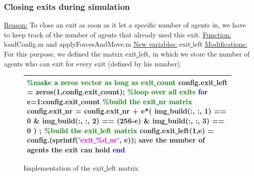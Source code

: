 \documentclass[11pt]{article}
\begin{document}
\subsubsection{Closing exits during simulation}

\underline{Reason:}
\newline
To close an exit as soon as it let a specific number of agents in, we have to keep track of the number of agents that already used this exit.
\newline
\underline{Function:}
\newline
loadConfig.m and applyForcesAndMove.m
\newline
\underline{New variables:}
\newline 
exit\underline{ }left
\newline
\underline{Modifications:}
\newline
For this purpose, we defined the matrix exit\underline{ }left, in which we store the number of agents who can exit for every exit (defined by his number).

\begin{figure}[H]
\centering
\begin{tabular}
{|>{\large}m{\textwidth}|} \hline
\bigskip
\textcolor{green}{\%make a zeros vector as long as exit\underline{ }count}
\newline
config.exit\underline{ }left = zeros(1,config.exit\underline{ }count);
\newline
\textcolor{green}{\%loop over all exits}
\newline
\textcolor{blue}{for} e=1:config.exit\underline{ }count
\newline
\textcolor{green}{\%build the exit\underline{ }nr matrix}
\newline
config.exit\underline{ }nr = config.exit\underline{ }nr + e*( img\underline{ }build(:, :, 1) == 0 \& img\underline{ }build(:, :, 2) == (256-e) \& img\underline{ }build(:, :, 3) == 0 ) ;
\newline
\textcolor{green}{\%build the exit\underline{ }left matrix}
\newline
config.exit\underline{ }left(1,e) = config.(sprintf(\textcolor{magenta}{'exit\underline{ }\%d\underline{ }nr'}, e)); save the number of agents the exit can hold
\newline
\textcolor{blue}{end}
\bigskip
\\ \hline
\end{tabular}
\caption{Implementation of the exit\underline{ }left matrix}
\end{figure}
\end{document}
